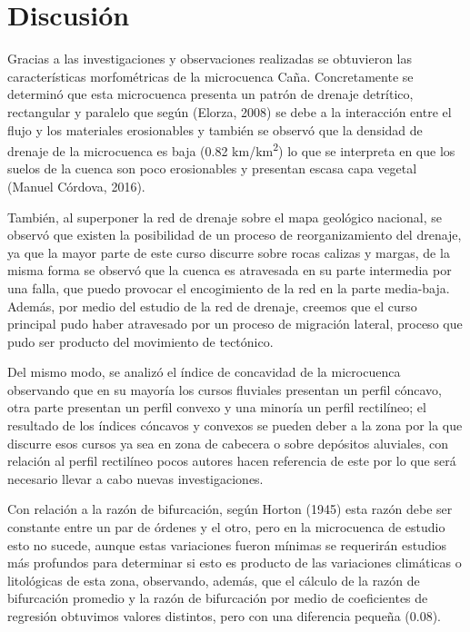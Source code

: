 \documentclass[11pt,]{article}
\begin{document}
\section{Discusión}\label{discusiuxf3n}

Gracias a las investigaciones y observaciones realizadas se obtuvieron
las características morfométricas de la microcuenca Caña. Concretamente
se determinó que esta microcuenca presenta un patrón de drenaje
detrítico, rectangular y paralelo que según (Elorza, 2008) se debe a la
interacción entre el flujo y los materiales erosionables y también se
observó que la densidad de drenaje de la microcuenca es baja (0.82
km/km\textsuperscript{2}) lo que se interpreta en que los suelos de la
cuenca son poco erosionables y presentan escasa capa vegetal (Manuel
Córdova, 2016).

También, al superponer la red de drenaje sobre el mapa geológico
nacional, se observó que existen la posibilidad de un proceso de
reorganizamiento del drenaje, ya que la mayor parte de este curso
discurre sobre rocas calizas y margas, de la misma forma se observó que
la cuenca es atravesada en su parte intermedia por una falla, que puedo
provocar el encogimiento de la red en la parte media-baja. Además, por
medio del estudio de la red de drenaje, creemos que el curso principal
pudo haber atravesado por un proceso de migración lateral, proceso que
pudo ser producto del movimiento de tectónico.

Del mismo modo, se analizó el índice de concavidad de la microcuenca
observando que en su mayoría los cursos fluviales presentan un perfil
cóncavo, otra parte presentan un perfil convexo y una minoría un perfil
rectilíneo; el resultado de los índices cóncavos y convexos se pueden
deber a la zona por la que discurre esos cursos ya sea en zona de
cabecera o sobre depósitos aluviales, con relación al perfil rectilíneo
pocos autores hacen referencia de este por lo que será necesario llevar
a cabo nuevas investigaciones.

Con relación a la razón de bifurcación, según Horton (1945) esta razón
debe ser constante entre un par de órdenes y el otro, pero en la
microcuenca de estudio esto no sucede, aunque estas variaciones fueron
mínimas se requerirán estudios más profundos para determinar si esto es
producto de las variaciones climáticas o litológicas de esta zona,
observando, además, que el cálculo de la razón de bifurcación promedio y
la razón de bifurcación por medio de coeficientes de regresión obtuvimos
valores distintos, pero con una diferencia pequeña (0.08).
\end{document}
